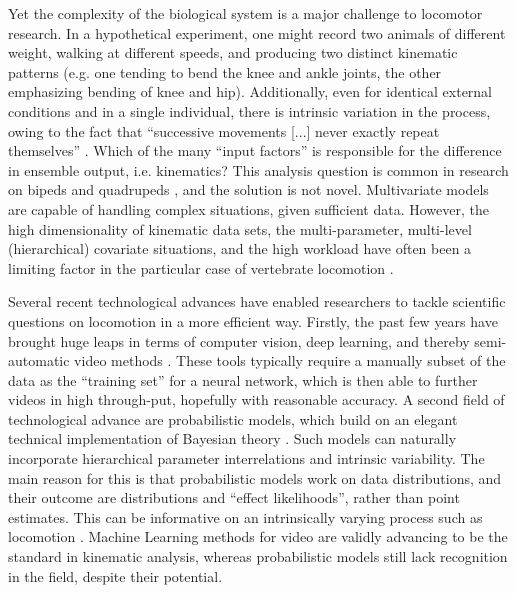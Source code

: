 Yet the complexity of the biological system is a major challenge to locomotor research.
In a hypothetical experiment, one might record two animals of different weight, walking at different speeds, and producing two distinct kinematic patterns (e.g. one tending to bend the knee and ankle joints, the other emphasizing bending of knee and hip).
Additionally, even for identical external conditions and in a single individual, there is intrinsic variation in the process, owing to the fact that ``successive movements [...] never exactly repeat themselves'' \citep{Bernstein1935}.
Which of the many ``input factors'' is responsible for the difference in ensemble output, i.e. kinematics?
This analysis question is common in research on bipeds \citep[e.g.][]{Ganley2005,StifflerJoachim2020,Bruton2013} and quadrupeds \citep[e.g.][]{Irschick1999,Pike2002,Stavrakakis2014}, and the solution is not novel.
Multivariate models are capable of handling complex situations, given sufficient data.
However, the high dimensionality of kinematic data sets, the multi-parameter, multi-level (hierarchical) covariate situations, and the high  workload have often been a limiting factor in the particular case of vertebrate locomotion \citep{Seethapathi2019,Michelini2020,Jackson2016}.


Several recent technological advances have enabled researchers to tackle scientific questions on locomotion in a more efficient way.
Firstly, the past few years have brought huge leaps in terms of computer vision, deep learning, and thereby semi-automatic video  methods \citep[][\textit{cf.} Ch. \ref{cpt:digitization}]{Karashchuk2021,Mathis2020,Jackson2016,Corcoran2021,MMielke2020}.
These tools typically require a manually  subset of the data as the ``training set'' for a neural network, which is then able to  further videos in high through-put, hopefully with reasonable accuracy.
A second field of technological advance are probabilistic models, which build on an elegant technical implementation of Bayesian theory \citep[Markov Chain Monte Carlo / MCMC sampling, \textit{cf.}][]{McElreath2018,Gelman2013,vandeSchoot2021}.
Such models can naturally incorporate hierarchical parameter interrelations and intrinsic variability.
The main reason for this is that probabilistic models work on data distributions, and their outcome are distributions and ``effect likelihoods'', rather than point estimates.
This can be informative on an intrinsically varying process such as locomotion \citep{Mielke2018}. %
Machine Learning methods for video  are validly advancing to be the standard in kinematic analysis, whereas probabilistic models still lack recognition in the field, despite their potential.


